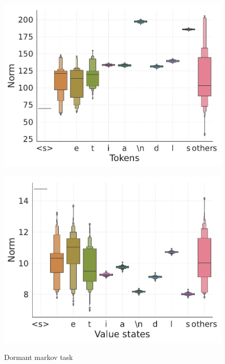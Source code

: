 \begin{figure}
      \centering
  \begin{minipage}{0.45\textwidth}
      \centering
      \label{fig:appendix-dormant-markov-massive}
      \vspace{-.2em}
      \includegraphics[width=\linewidth]{Figures/figures_pretraining/dormant_markov/dormant_markov_L3_massive.pdf}
  \end{minipage}
  \hspace{-1em}
    \begin{minipage}{0.45\textwidth}
      \centering
      \label{fig:appendix-dormant-markov-minor}
      \vspace{-.2em}
      \includegraphics[width=\linewidth]{Figures/figures_pretraining/dormant_markov/dormant_markov_L3_minor.pdf}
  \end{minipage}
  \vspace{-1em}
  \caption{\small Dormant markov task}
  \label{figure:appendix-pretraining-dormant-markov-findings-2}
  \vspace{-1em}
\end{figure}